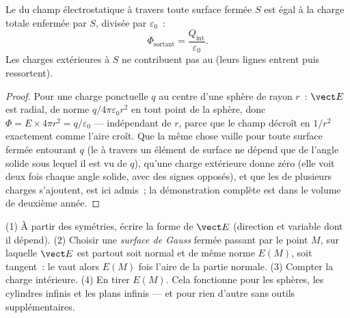 \begin{theorem}\label{thm:b1:electrostatics-gauss:gauss}
Le  du champ électrostatique à travers toute surface fermée $S$ est égal à
la charge totale enfermée par $S$, divisée par $\varepsilon_0$~:
\[
\Phi_{\text{sortant}} = \frac{Q_{\text{int}}}{\varepsilon_0} .
\]
Les charges extérieures à $S$ ne contribuent pas au  (leurs lignes entrent
puis ressortent).
\end{theorem}

\begin{proof}
Pour une charge ponctuelle $q$ au centre d'une sphère de rayon $r$~:
$\vect E$ est radial, de norme $q/4\pi\varepsilon_0r^2$ en tout point de la
sphère, donc $\Phi = E \times 4\pi r^2 = q/\varepsilon_0$ --- indépendant de $r$,
parce que le champ décroît en $1/r^2$ exactement comme l'aire croît. Que la
même chose vaille pour toute surface fermée entourant $q$ (le  à travers
un élément de surface ne dépend que de l'angle solide sous lequel il est vu
de $q$), qu'une charge extérieure donne zéro (elle voit deux fois chaque angle
solide, avec des signes opposés), et que les  de plusieurs charges
s'ajoutent, est ici admis~; la démonstration complète est dans le volume de
deuxième année.
\end{proof}

\begin{method}\label{meth:b1:electrostatics-gauss:gauss}
(1) À partir des symétries, écrire la forme de $\vect E$ (direction et
variable dont il dépend). (2) Choisir une \emph{surface de Gauss} fermée
passant par le point $M$, sur laquelle $\vect E$ est partout soit normal et de
même norme $E(M)$, soit tangent~: le  vaut alors $E(M)$ fois l'aire de la
partie normale. (3) Compter la charge intérieure. (4) En tirer $E(M)$. Cela
fonctionne pour les sphères, les cylindres infinis et les plans infinis ---
et pour rien d'autre sans outils supplémentaires.
\end{method}

